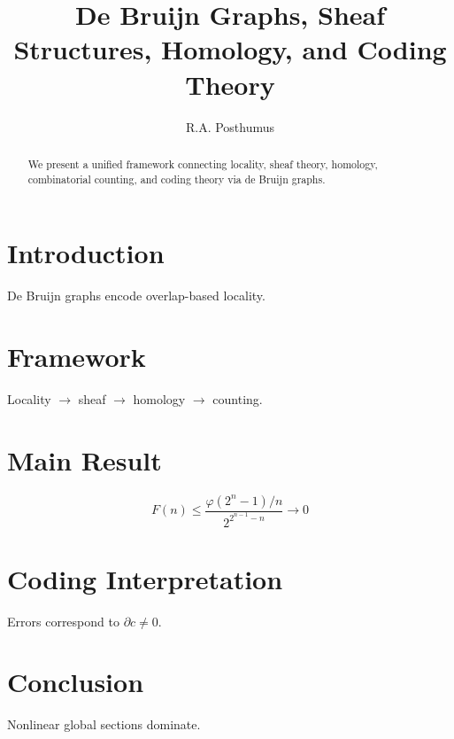 \documentclass[journal]{IEEEtran}
\title{De Bruijn Graphs, Sheaf Structures, Homology, and Coding Theory}
\author{R.A. Posthumus}
\begin{document}
\maketitle

\begin{abstract}
We present a unified framework connecting locality, sheaf theory, homology, combinatorial counting, and coding theory via de Bruijn graphs.
\end{abstract}

\section{Introduction}
De Bruijn graphs encode overlap-based locality.

\section{Framework}
Locality $\rightarrow$ sheaf $\rightarrow$ homology $\rightarrow$ counting.

\section{Main Result}
\[
F(n) \le \frac{\varphi(2^n-1)/n}{2^{2^{n-1}-n}} \to 0
\]

\section{Coding Interpretation}
Errors correspond to $\partial c \neq 0$.

\section{Conclusion}
Nonlinear global sections dominate.
\end{document}
